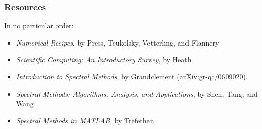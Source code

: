 \documentclass[]{beamer}
\begin{document}
\begin{frame}
  \frametitle{Resources}
  {\Large\underline{In no particular order:}}
  \vspace{1cm}
  \begin{itemize}
    \item \textit{Numerical Recipes}, by Press, Teukolsky, Vetterling, and Flannery
    \item \textit{Scientific Computing: An Introductory Survey}, by Heath
    \item \textit{Introduction to Spectral Methods}, by Grandclement (\href{http://arxiv.org/abs/gr-qc/0609020}{arXiv:gr-qc/0609020}).
    \item \textit{Spectral Methods: Algorithms, Analysis, and Applications}, by Shen, Tang, and Wang
    \item \textit{Spectral Methods in MATLAB}, by Trefethen
  \end{itemize}
\end{frame}
\end{document}
